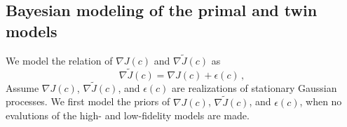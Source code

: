 \documentclass[a4paper,onecolumn]{article}
\theoremstyle{remark}
\begin{document}
\subsection{Bayesian modeling of the primal and twin models}
\label{bayesian_model}
\noindent We model the relation of $\nabla J(c)$ and $\nabla \tilde{J}(c)$ as
\begin{equation}
    \nabla \tilde{J}(c) = \nabla J(c) + \epsilon(c)\,,
    \label{base Bayes model}
\end{equation}
Assume $\nabla J(c)$, $\nabla \tilde{J}(c)$, and $\epsilon(c)$ 
are realizations of stationary Gaussian processes. We first model the priors
of $\nabla J(c)$, $\nabla \tilde{J}(c)$, and $\epsilon(c)$, when no evalutions
of the high- and low-fidelity models are made.\\
\end{document}
